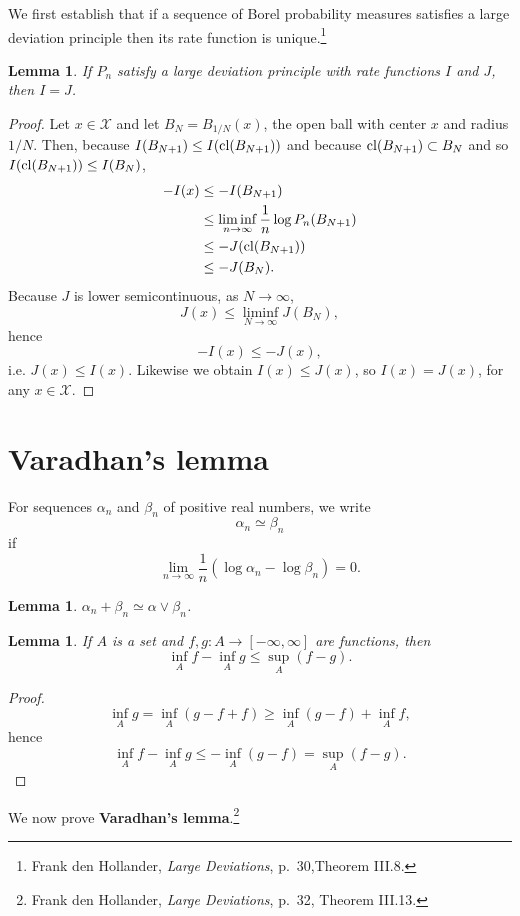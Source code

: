 \documentclass{article}
\newcommand{\cl}{\ensuremath\mathrm{cl}}
\newtheorem{lemma}[theorem]{Lemma}
\theoremstyle{definition}
\begin{document}
We first establish that if a sequence of Borel probability measures satisfies a large deviation principle then its rate function is unique.\footnote{Frank
den Hollander, {\em Large Deviations}, p.~30,Theorem III.8.}

\begin{lemma}
If $P_n$ satisfy a large deviation principle with rate functions $I$ and $J$, then $I=J$.
\end{lemma}
\begin{proof}
Let $x \in \mathcal{X}$ and let $B_N = B_{1/N}(x)$, the open ball with center $x$ and radius $1/N$. 
Then, because $I(B_{N+1}) \leq I(\cl (B_{N+1}))$ and because $\cl(B_{N+1}) \subset B_N$ and so
$I(\cl(B_{N+1})) \leq I(B_N)$,
\begin{align*}
-I(x)&\leq -I(B_{N+1})\\
&\leq \liminf_{n \to \infty} \frac{1}{n} \log P_n(B_{N+1})\\
&\leq -J(\cl(B_{N+1}))\\
&\leq -J(B_N).
\end{align*}
Because $J$ is lower semicontinuous, as $N \to \infty$,
\[
J(x) \leq \liminf_{N \to \infty} J(B_N),
\]
hence
\[
-I(x) \leq -J(x),
\]
i.e. $J(x) \leq I(x)$. Likewise we obtain $I(x) \leq J(x)$, so $I(x)=J(x)$, for any $x \in \mathcal{X}$.
\end{proof}

\section{Varadhan's lemma}
For sequences $\alpha_n$ and $\beta_n$ of positive real numbers, 
we write 
\[
\alpha_n \simeq \beta_n
\]
if
\[
\lim_{n \to \infty} \frac{1}{n}(\log \alpha_n - \log \beta_n) = 0.
\]

\begin{lemma}
$\alpha_n+\beta_n \simeq \alpha \vee \beta_n$.
\label{equivalent}
\end{lemma}



\begin{lemma}
If $A$ is a set and $f,g:A \to [-\infty,\infty]$ are functions, then
\[
\inf_A f - \inf_A g  \leq \sup_A (f-g).
\]
\label{infsup}
\end{lemma}
\begin{proof}
\[
\inf_A g = \inf_A (g-f+f) \geq \inf_A (g-f) + \inf_A f,
\]
hence
\[
\inf_A f - \inf_A g \leq -\inf_A (g-f) = \sup_A (f-g).
\]
\end{proof}


We now prove \textbf{Varadhan's lemma}.\footnote{Frank den Hollander, {\em Large Deviations}, p.~32, Theorem III.13.}
\end{document}

